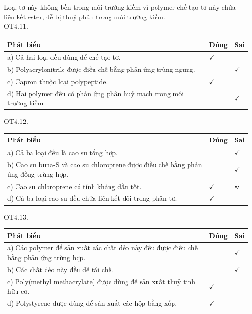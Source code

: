 \documentclass[10pt]{article}
\begin{document}
Loại tơ này không bền trong môi trường kiềm vì polymer chế tạo tơ này chứa liên kết ester, dễ bị thuỷ phân trong môi trường kiềm.\\
OT4.11.

\begin{center}
\begin{tabular}{|l|l|l|}
\hline
Phát biểu & Đúng & Sai \\
\hline
a) Cả hai loại đều dùng để chế tạo tơ. & $\checkmark$ &  \\
\hline
b) Polyacrylonitrile được điều chế bằng phản ứng trùng ngưng. &  & $\checkmark$ \\
\hline
c) Capron thuộc loại polypeptide. & $\checkmark$ &  \\
\hline
d) Hai polymer đều có phản ứng phân huỷ mạch trong môi trường kiềm. &  & $\checkmark$ \\
\hline
\end{tabular}
\end{center}

OT4.12.

\begin{center}
\begin{tabular}{|l|l|l|}
\hline
Phát biểu & Đúng & Sai \\
\hline
a) Cả ba loại đều là cao su tổng hợp. &  & $\checkmark$ \\
\hline
b) Cao su buna-S và cao su chloroprene được điều chế bằng phản ứng đồng trùng hợp. &  & $\checkmark$ \\
\hline
c) Cao su chloroprene có tính kháng dầu tốt. & $\checkmark$ & w \\
\hline
d) Cả ba loại cao su đều chứa liên kết đôi trong phân từ. & $\checkmark$ &  \\
\hline
\end{tabular}
\end{center}

OT4.13.

\begin{center}
\begin{tabular}{|l|l|l|}
\hline
Phát biểu & Đúng & Sai \\
\hline
a) Các polymer để sản xuất các chất dẻo này đều được điều chế bằng phản ứng trùng hợp. &  & $\checkmark$ \\
\hline
b) Các chất dẻo này đều dễ tái chế. &  & $\checkmark$ \\
\hline
c) Poly(methyl methacrylate) được dùng để sản xuất thuỷ tinh hữu cơ. & $\checkmark$ &  \\
\hline
d) Polystyrene được dùng để sản xuất các hộp bằng xốp. & $\checkmark$ &  \\
\hline
\end{tabular}
\end{center}
\end{document}
